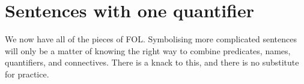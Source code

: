 \chapter{Sentences with one quantifier}
\label{s:MoreMonadic}

We now have all of the pieces of FOL. Symbolising more complicated sentences will only be a matter of knowing the right way to combine predicates, names, quantifiers, and connectives. There is a knack to this, and there is no substitute for practice.


